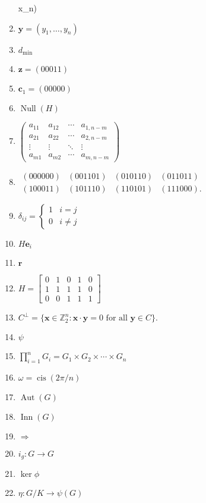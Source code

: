 \documentclass[oneside,10pt,]{article}
\newcommand{\inn}{\operatorname{Inn}}
\newcommand{\aut}{\operatorname{Aut}}
\newcommand{\cis}{\operatorname{cis}}
\newcommand{\Null}{\operatorname{Null}}
\newcommand{\amp}{&}
\begin{document}
\begin{enumerate}
x_n)\)%
\item{}\({\mathbf y} = (y_1, \ldots,
y_n)\)%
\item{}\(d_{\min}\)%
\item{}\({\mathbf z} = (00011)\)%
\item{}\({\mathbf c}_1 = (00000)\)%
\item{}\(\Null(H)\)%
\item{}\(\begin{pmatrix}
a_{11} & a_{12} & \cdots & a_{1,n-m} \\
a_{21} & a_{22} & \cdots & a_{2,n-m} \\
\vdots & \vdots & \ddots & \vdots    \\
a_{m1} & a_{m2} & \cdots & a_{m,n-m}
\end{pmatrix}\)%
\item{}\(\begin{array}{cccc}
(000000) & (001101) & (010110) & (011011) \\
(100011) & (101110) & (110101) & (111000).
\end{array}\)%
\item{}\(\delta_{ij} =
\begin{cases}
1 & i = j \\
0 & i \neq j
\end{cases}\)%
\item{}\(H{\mathbf e}_i\)%
\item{}\({\mathbf r}\)%
\item{}\(H =\begin{bmatrix}
0 \amp 1 \amp 0 \amp 1 \amp 0 \\
1 \amp 1 \amp 1 \amp 1 \amp 0 \\
0 \amp 0 \amp 1 \amp 1 \amp 1
\end{bmatrix}\)%
\item{}\(C^\perp = \{ {\mathbf x} \in {\mathbb Z}_2^n :  {\mathbf x} \cdot {\mathbf y} = 0 \text{ for all } {\mathbf y} \in C \}\text{.}\)%
\item{}\(\psi\)%
\item{}\(\prod_{i = 1}^n G_i = G_1 \times G_2 \times \cdots \times G_n\)%
\item{}\(\omega = \cis(2 \pi /n)\)%
\item{}\(\aut(G)\)%
\item{}\(\inn(G)\)%
\item{}\(\Rightarrow\)%
\item{}\(i_g : G \to G\)%
\item{}\(\ker \phi\)%
\item{}\(\eta: G/K \rightarrow \psi(G)\)%

\end{enumerate}
\end{document}
